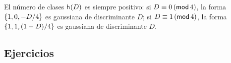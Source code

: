 \begin{obsRepresentaciones}\label{obs:representaciones:gaussianas}
	El n\'umero de clases $\nClases(D)$ es siempre positivo:
	si $D\equiv 0\tmodulo[4]$, la forma
	$\binaria{1,0,-D/4}$ es gaussiana de discriminante $D$;
	si $D\equiv 1\tmodulo[4]$, la forma
	$\binaria{1,1,(1-D)/4}$ es gaussiana de discriminante $D$.
\end{obsRepresentaciones}

\subsection*{Ejercicios}


